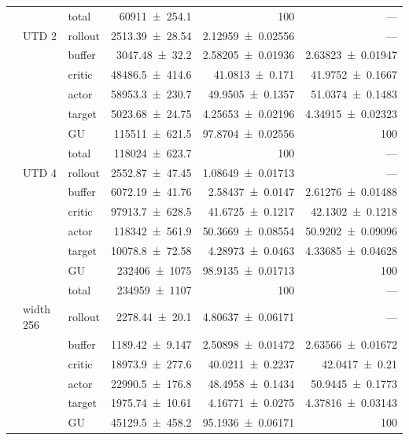 {\begin{longtable}{@{}lllrrr@{}}
     &  & total & \num{60911+-254.1} & \num{100} & --- \\
    \addlinespace[2pt]
     & UTD 2 & rollout & \num{2513.39+-28.54} & \num{2.12959+-0.02556} & --- \\
     &  & buffer & \num{3047.48+-32.2} & \num{2.58205+-0.01936} & \num{2.63823+-0.01947} \\
     &  & critic & \num{48486.5+-414.6} & \num{41.0813+-0.171} & \num{41.9752+-0.1667} \\
     &  & actor & \num{58953.3+-230.7} & \num{49.9505+-0.1357} & \num{51.0374+-0.1483} \\
     &  & target & \num{5023.68+-24.75} & \num{4.25653+-0.02196} & \num{4.34915+-0.02323} \\
     &  & GU & \num{115511+-621.5} & \num{97.8704+-0.02556} & 100 \\
     &  & total & \num{118024+-623.7} & \num{100} & --- \\
    \addlinespace[2pt]
     & UTD 4 & rollout & \num{2552.87+-47.45} & \num{1.08649+-0.01713} & --- \\
     &  & buffer & \num{6072.19+-41.76} & \num{2.58437+-0.0147} & \num{2.61276+-0.01488} \\
     &  & critic & \num{97913.7+-628.5} & \num{41.6725+-0.1217} & \num{42.1302+-0.1218} \\
     &  & actor & \num{118342+-561.9} & \num{50.3669+-0.08554} & \num{50.9202+-0.09096} \\
     &  & target & \num{10078.8+-72.58} & \num{4.28973+-0.0463} & \num{4.33685+-0.04628} \\
     &  & GU & \num{232406+-1075} & \num{98.9135+-0.01713} & 100 \\
     &  & total & \num{234959+-1107} & \num{100} & --- \\
    \addlinespace[2pt]
     & width 256 & rollout & \num{2278.44+-20.1} & \num{4.80637+-0.06171} & --- \\
     &  & buffer & \num{1189.42+-9.147} & \num{2.50898+-0.01472} & \num{2.63566+-0.01672} \\
     &  & critic & \num{18973.9+-277.6} & \num{40.0211+-0.2237} & \num{42.0417+-0.21} \\
     &  & actor & \num{22990.5+-176.8} & \num{48.4958+-0.1434} & \num{50.9445+-0.1773} \\
     &  & target & \num{1975.74+-10.61} & \num{4.16771+-0.0275} & \num{4.37816+-0.03143} \\
     &  & GU & \num{45129.5+-458.2} & \num{95.1936+-0.06171} & 100 \\

\end{longtable}}
